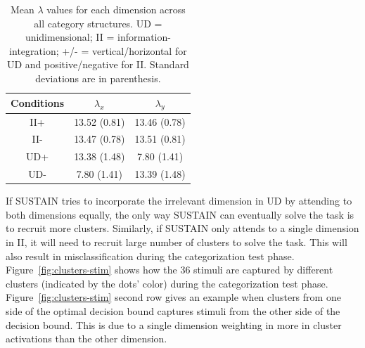 \documentclass[10pt,letterpaper]{article}
\begin{document}
\begin{table}[h]
    \centering
\caption{\label{tab:lambda}Mean $\lambda$ values for each dimension across
    all category structures. UD = unidimensional; II =
    information-integration; +/- = vertical/horizontal for UD and
    positive/negative for II. Standard deviations are in parenthesis.}
    \begin{tabular}[t]{ccc}
    \hline
    Conditions & $\lambda_{x}$ & $\lambda_{y}$ \\
    \hline
    II+ & 13.52 (0.81) & 13.46 (0.78) \\
    II- & 13.47 (0.78) & 13.51 (0.81)  \\
    UD+ & 13.38 (1.48) & 7.80 (1.41)  \\
    UD- & 7.80 (1.41) & 13.39 (1.48) \\
    \hline
    \end{tabular}
\end{table}

If SUSTAIN tries to incorporate the irrelevant dimension in UD by
attending to both dimensions equally, the only way SUSTAIN can eventually
solve the task is to recruit more clusters. Similarly, if SUSTAIN only attends
to a single dimension in II, it will need to recruit large number of clusters
to solve the task. This will also result in misclassification during the
categorization test phase. Figure~\ref{fig:clusters-stim} shows how the 36
stimuli are captured by different clusters (indicated by the dots' color) during
the categorization test phase. Figure~\ref{fig:clusters-stim} second row
gives an example when clusters from one side of the optimal decision
bound captures stimuli from the other side of the decision bound. This is due
to a single dimension weighting in more in cluster activations than the other
dimension.

% 
\end{document}
